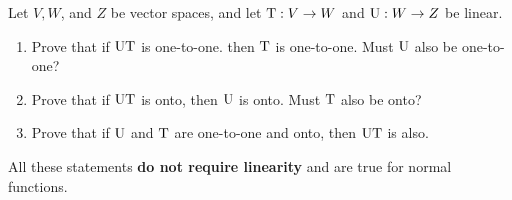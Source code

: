 \begin{exercise} \label{exercise 2.3.12}
Let \(V, W\), and \(Z\) be vector spaces, and let \(\mathrm{T} : V \to W\) and \(\mathrm{U}: W \to Z\) be linear.
\begin{enumerate}
\item Prove that if \(\mathrm{U}\mathrm{T}\) is one-to-one. then \(\mathrm{T}\) is one-to-one.
    Must \(\mathrm{U}\) also be one-to-one?
\item Prove that if \(\mathrm{U}\mathrm{T}\) is onto, then \(\mathrm{U}\) is onto.
    Must \(\mathrm{T}\) also be onto?
\item Prove that if \(\mathrm{U}\) and \(\mathrm{T}\) are one-to-one and onto, then \(\mathrm{U}\mathrm{T}\) is also.
\end{enumerate}
\end{exercise}

\begin{note}
All these statements \textbf{do not require linearity} and are true for normal functions.
\end{note}

